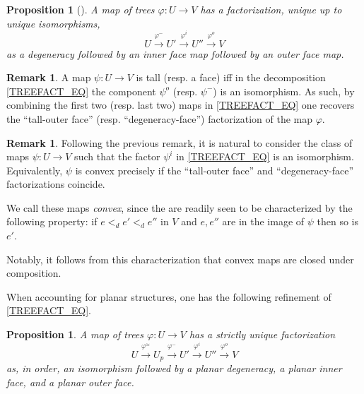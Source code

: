 \documentclass[a4paper,10pt
,draft
]{article}%
\numberwithin{equation}{section}
\numberwithin{figure}{section}
\newtheorem{proposition}[equation]{Proposition}%
\theoremstyle{definition} %
\newtheorem{remark}[equation]{Remark}%
\newcommand{\1}{\ensuremath{\mathbbm 1}}%
\begin{document}
\begin{proposition}[{\cite[Prop. 2.2]{BP_edss}}]
	A map of trees $\varphi \colon U \to V$ has a factorization, unique up to unique isomorphisms,
\begin{equation}\label{TREEFACT_EQ}
	U \xrightarrow{\varphi^-} 
	U' \xrightarrow{\varphi^i} 
	U'' \xrightarrow{\varphi^o} V
\end{equation}
	as a degeneracy followed by an inner face map followed by an outer face map.
\end{proposition}


\begin{remark}\label{TODF REM}
	A map $\psi \colon U \to V$
	is tall (resp. a face)
	iff in the decomposition \eqref{TREEFACT_EQ}
	the component $\psi^o$ (resp. $\psi^-$)
	is an isomorphism.
	As such, by combining the 
	first two (resp. last two)
	maps in \eqref{TREEFACT_EQ}
	one recovers the 
	``tall-outer face'' 
	(resp. ``degeneracy-face'')
	factorization of the map $\varphi$.
\end{remark}


\begin{remark}\label{CNVXM REM}
	Following the previous remark, 
	it is natural to consider the class of maps
	$\psi \colon U \to V$ such that
	the factor $\psi^i$ in \eqref{TREEFACT_EQ}
	is an isomorphism.
	Equivalently, $\psi$ is convex precisely if
	the ``tall-outer face'' and ``degeneracy-face''
	factorizations coincide.
	
	We call these maps \textit{convex},
	since the are readily seen to be 
	characterized by the following property:
	if $e <_d e' <_d e''$
	in $V$ and $e,e''$ are in the image of $\psi$
	then so is $e'$.
	
	Notably, it follows from this characterization that convex maps are closed under composition.
\end{remark}


When accounting for planar structures,
one has the following refinement of \eqref{TREEFACT_EQ}.

\begin{proposition}
      A map of trees $\varphi \colon U \to V$ has a strictly unique factorization
      \begin{equation}
            \label{OMEGAFACT_EQ}
            U \xrightarrow{\varphi^{\simeq}} U_p \xrightarrow{\varphi^-} U' \xrightarrow{\varphi^i} U'' \xrightarrow{\varphi^o} V            
      \end{equation}
      as, in order, an isomorphism followed by
      a planar degeneracy, a planar inner face, and a planar outer face.
\end{proposition}
\end{document}
